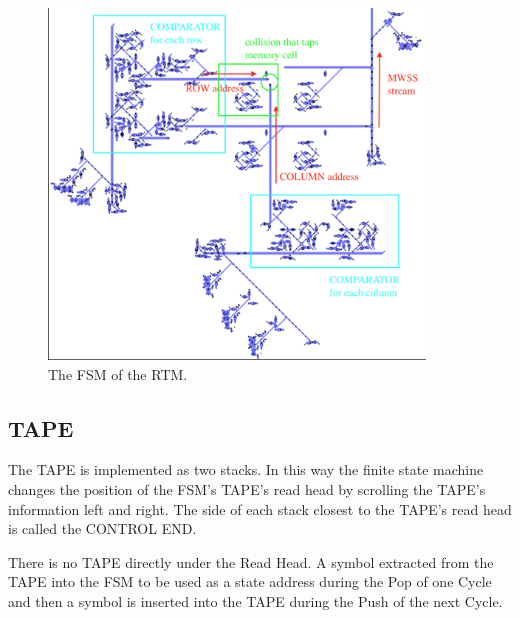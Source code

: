 \documentclass{article}
\begin{document}
\vspace{1em}

\begin{figure}[h]
\centering
\includegraphics[width=10cm,keepaspectratio]{images/FSM.png}
\captionsetup{labelformat=empty} \caption{The FSM of the RTM.}
\end{figure}
\subsection{TAPE}


The TAPE is implemented as two stacks. In this way the finite state machine changes the position of the FSM's TAPE's read head by scrolling the TAPE's information left and right. The side of each stack closest to the TAPE's read head is called the CONTROL END.





There is no TAPE directly under the Read Head. A symbol extracted from the TAPE  into the FSM to be used as a state address during the Pop of one Cycle and then a symbol is inserted into the TAPE during the Push of the next Cycle.
\end{document}
